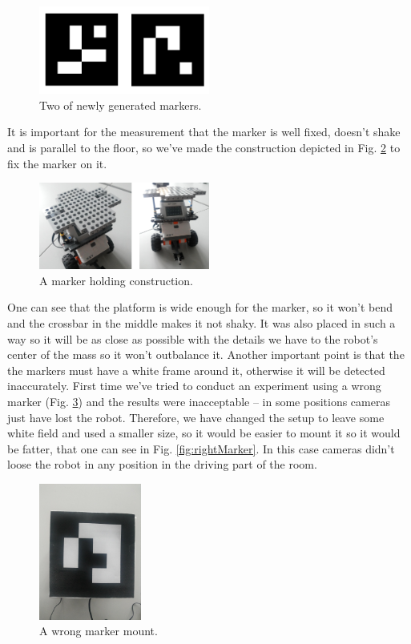 \documentclass[a4paper, 12pt]{article}
\begin{document}
\begin{figure}[h]
  \centering
  \caption{Two of newly generated markers.\label{fig:markers}}
  \includegraphics[width=0.5\textwidth]{markers}
\end{figure}

It is important for the measurement that the marker is well fixed, doesn't shake and is parallel to the floor, so we've made the construction depicted in Fig. \ref{fig:markerHolder} to fix the marker on it.

\begin{figure}[h]
  \centering
  \caption{A marker holding construction.\label{fig:markerHolder}}
  \includegraphics[width=0.5\textwidth]{markerHolder}
\end{figure}

One can see that the platform is wide enough for the marker, so it won't bend and the crossbar in the middle makes it not shaky. It was also placed in such a way so it will be as close as possible with the details we have to the robot's center of the mass so it won't outbalance it. Another important point is that the the markers must have a white frame around it, otherwise it will be detected inaccurately. First time we've tried to conduct an experiment using a wrong marker (Fig. \ref{fig:wrongMarker}) and the results were inacceptable -- in some positions cameras just have lost the robot. Therefore, we have changed the setup to leave some white field and used a smaller size, so it would be easier to mount it so it would be fatter, that one can see in Fig. \ref{fig:rightMarker}. In this case cameras didn't loose the robot in any position in the driving part of the room.

\begin{figure}[h]
  \centering
  \caption{A wrong marker mount.\label{fig:wrongMarker}}
  \includegraphics[width=0.3\textwidth]{wrongMarker}
\end{figure}
\end{document}
